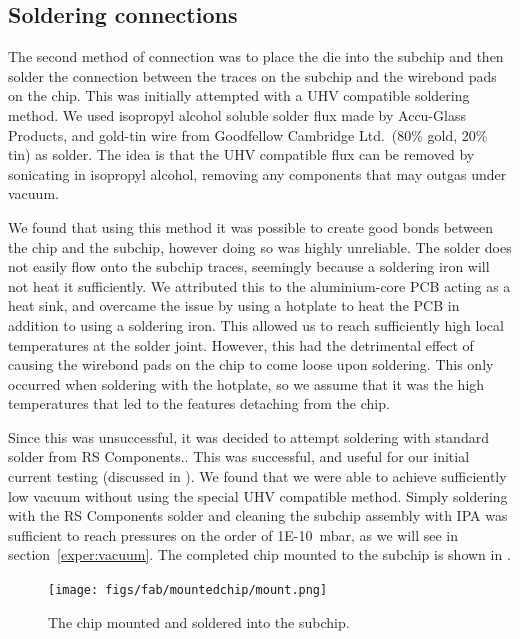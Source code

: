 \subsection{Soldering connections}
\label{fab:solder}

The second method of connection was to place the die into the subchip and then
solder the connection between the traces on the subchip and the wirebond pads
on the chip. This was initially attempted with a UHV compatible soldering
method. We used isopropyl alcohol soluble solder flux made by Accu-Glass
Products, and gold-tin wire from Goodfellow Cambridge Ltd.\ (80\% gold, 20\%
tin) as solder. The idea is that the UHV compatible flux can be removed by
sonicating in isopropyl alcohol, removing any components that may outgas under
vacuum.

We found that using this method it was possible to create good bonds between
the chip and the subchip, however doing so was highly unreliable. The solder
does not easily flow onto the subchip traces, seemingly because a soldering
iron will not heat it sufficiently. We attributed this to the aluminium-core
PCB acting as a heat sink, and overcame the issue by using a hotplate to heat
the PCB in addition to using a soldering iron. This allowed us to reach
sufficiently high  local temperatures at the solder joint.
%
However, this had the detrimental effect of causing the wirebond pads on the
chip to come loose upon soldering. This only occurred when soldering with the
hotplate, so we assume that it was the high temperatures that led to the
features detaching from the chip.

Since this was unsuccessful, it was decided to attempt soldering with standard
solder from RS Components.. This was successful, and useful for our initial current
testing (discussed in ). We found that we were able to
achieve sufficiently low vacuum without using the special UHV compatible
method. Simply soldering with the RS Components solder and cleaning the subchip
assembly with IPA was sufficient to reach pressures on the order of
\SI{1E-10}{\milli\bar}, as we will see in section~\ref{exper:vacuum}. The
completed chip mounted to the subchip is shown in
.

\begin{figure}
  \centering
  \texttt{[image: figs/fab/mountedchip/mount.png]}
  \caption[A mounted chip]{The chip mounted and soldered into the subchip.}
  \label{fab:fig:mountedchip}
\end{figure}

